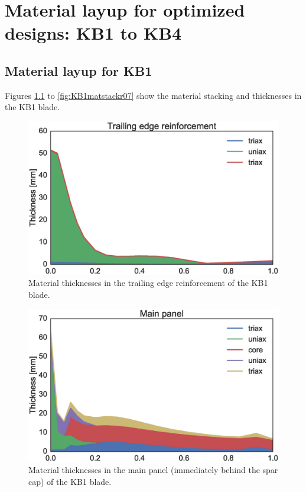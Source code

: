 \chapter{Material layup for optimized designs: KB1 to KB4}
\label{ch:material_layup_KB1_KB4}
\section{Material layup for KB1}

Figures \ref{fig:KB1matstackr01} to \ref{fig:KB1matstackr07} show the material stacking and thicknesses in the KB1 blade. 

\begin{figure}[pth]
\begin{center}
	\includegraphics[width=.85\linewidth]{figures/KB1_region01.eps}
\end{center}
\caption{Material thicknesses in the trailing edge reinforcement of the KB1 blade.}
\label{fig:KB1matstackr01}
\end{figure}

\begin{figure}[pth]
\begin{center}
	\includegraphics[width=.85\linewidth]{figures/KB1_region02.eps}
\end{center}
\caption{Material thicknesses in the main panel (immediately behind the spar cap) of the KB1 blade.}
\label{fig:KB1matstackr02}
\end{figure}


